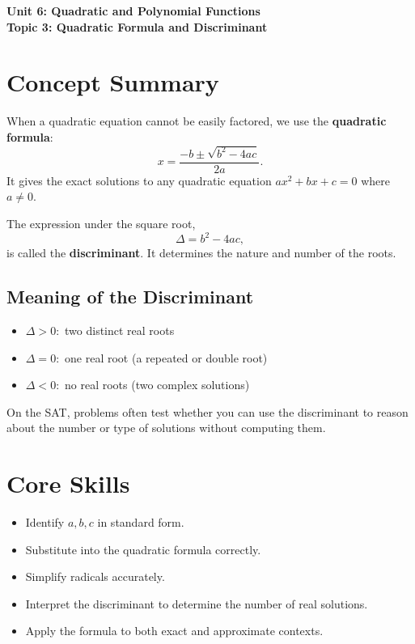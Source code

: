 \documentclass[14pt]{extarticle}
\begin{document}
\raggedright
{}

\begin{center}
    \LARGE \textbf{Unit 6: Quadratic and Polynomial Functions} \\[6pt]
    \Large \textbf{Topic 3: Quadratic Formula and Discriminant}
\end{center}

\vspace{1em}

\section*{Concept Summary}

When a quadratic equation cannot be easily factored, we use the \textbf{quadratic formula}:
\[
x = \frac{-b \pm \sqrt{b^2 - 4ac}}{2a}.
\]
It gives the exact solutions to any quadratic equation \(ax^2 + bx + c = 0\) where \(a \ne 0\).

The expression under the square root,
\[
\Delta = b^2 - 4ac,
\]
is called the \textbf{discriminant}. It determines the nature and number of the roots.

\subsection*{Meaning of the Discriminant}
\begin{itemize}
  \item \(\Delta > 0:\) two distinct real roots
  \item \(\Delta = 0:\) one real root (a repeated or double root)
  \item \(\Delta < 0:\) no real roots (two complex solutions)
\end{itemize}

On the SAT, problems often test whether you can use the discriminant to reason about the number or type of solutions without computing them.

\section*{Core Skills}
\begin{itemize}
  \item Identify \(a, b, c\) in standard form.
  \item Substitute into the quadratic formula correctly.
  \item Simplify radicals accurately.
  \item Interpret the discriminant to determine the number of real solutions.
  \item Apply the formula to both exact and approximate contexts.
\end{itemize}
\end{document}
